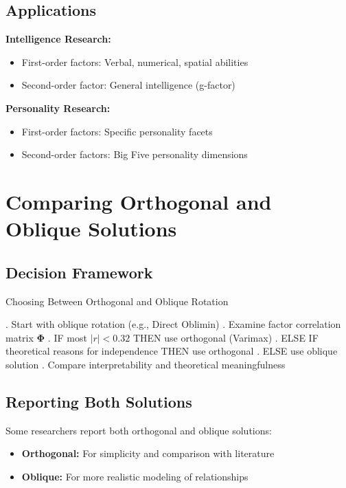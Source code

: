 \documentclass[a4paper]{tufte-book}
\begin{document}
\subsection{Applications}

\textbf{Intelligence Research:}
\begin{itemize}
\item First-order factors: Verbal, numerical, spatial abilities
\item Second-order factor: General intelligence (g-factor)
\end{itemize}

\textbf{Personality Research:}
\begin{itemize}
\item First-order factors: Specific personality facets
\item Second-order factors: Big Five personality dimensions
\end{itemize}

\section{Comparing Orthogonal and Oblique Solutions}

\subsection{Decision Framework}

\begin{algorithm}
\caption{Choosing Between Orthogonal and Oblique Rotation}
\begin{algorithmic}
. Start with oblique rotation (e.g., Direct Oblimin)
. Examine factor correlation matrix $\boldsymbol{\Phi}$
. IF most $|r| < 0.32$ THEN use orthogonal (Varimax)
. ELSE IF theoretical reasons for independence THEN use orthogonal
. ELSE use oblique solution
. Compare interpretability and theoretical meaningfulness
\end{algorithmic}
\end{algorithm}

\subsection{Reporting Both Solutions}

Some researchers report both orthogonal and oblique solutions:
\begin{itemize}
\item \textbf{Orthogonal:} For simplicity and comparison with literature
\item \textbf{Oblique:} For more realistic modeling of relationships
\end{itemize}
\end{document}
